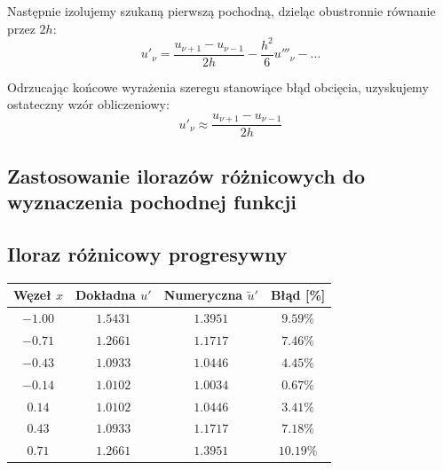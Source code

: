 \documentclass[a4paper,14pt]{scrartcl}
\begin{document}
Następnie izolujemy szukaną pierwszą pochodną, dzieląc obustronnie równanie przez
$2h$:$$u'_\nu = \frac{u_{\nu+1} - u_{\nu-1}}{2h} - \frac{h^2}{6}u'''_\nu - \dots$$

Odrzucając końcowe wyrażenia szeregu stanowiące błąd obcięcia, uzyskujemy ostateczny wzór obliczeniowy:
$$u'_\nu \approx \frac{u_{\nu+1} - u_{\nu-1}}{2h}$$


\newpage
\clearpage
\vspace*{\fill}
\begin{center}
    \section{Zastosowanie ilorazów różnicowych do wyznaczenia pochodnej funkcji}
\end{center}
\vspace*{\fill}
\clearpage

\newpage

\subsection{Iloraz różnicowy progresywny}

\begin{table}[h!]
    \centering
    \small
    \renewcommand{\arraystretch}{1.2}
    \begin{tabular}{|c|c|c|c|}
        \hline
        \textbf{Węzeł $x$} & \textbf{Dokładna $u'$} & \textbf{Numeryczna $\tilde{u}'$} & \textbf{Błąd [\%]} \\ \hline
        $-1.00$            & $    1.5431$           & $    1.3951$                     & $ 9.59\%$          \\ \hline
        $-0.71$            & $    1.2661$           & $    1.1717$                     & $ 7.46\%$          \\ \hline
        $-0.43$            & $    1.0933$           & $    1.0446$                     & $ 4.45\%$          \\ \hline
        $-0.14$            & $    1.0102$           & $    1.0034$                     & $ 0.67\%$          \\ \hline
        $ 0.14$            & $    1.0102$           & $    1.0446$                     & $ 3.41\%$          \\ \hline
        $ 0.43$            & $    1.0933$           & $    1.1717$                     & $ 7.18\%$          \\ \hline
        $ 0.71$            & $    1.2661$           & $    1.3951$                     & $10.19\%$          \\ \hline
    \end{tabular}
\end{table}
\end{document}
